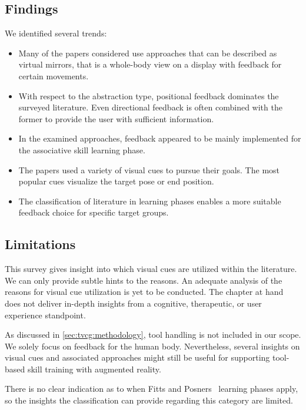 \subsection{Findings}
We identified several trends:
\begin{itemize}
    \vspace{-0.3cm}\item Many of the papers considered use approaches that can be described as virtual mirrors, that is a whole-body view on a display with feedback for certain movements.
    \vspace{-0.3cm}\item With respect to the abstraction type, positional feedback dominates the surveyed literature. Even directional feedback is often combined with the former to provide the user with sufficient information.
    \vspace{-0.3cm}\item In the examined approaches, feedback appeared to be mainly implemented for the associative skill learning phase.
    \vspace{-0.3cm}\item The papers used a variety of visual cues to pursue their goals. The most popular cues visualize the target pose or end position.
    \vspace{-0.3cm}\item The classification of literature in learning phases enables a more suitable feedback choice for specific target groups.
\end{itemize}

\subsection{Limitations}
This survey gives insight into which visual cues are utilized within the literature. We can only provide subtle hints to the reasons. An adequate analysis of the reasons for visual cue utilization is yet to be conducted. The chapter at hand does not deliver in-depth insights from a cognitive, therapeutic, or user experience standpoint.

As discussed in \autoref{sec:tvcg:methodology}, tool handling is not included in our scope. We solely focus on feedback for the human body. Nevertheless, several insights on visual cues and associated approaches might still be useful for supporting tool-based skill training with augmented reality.

There is no clear indication as to when Fitts and Posners~\cite{fitts1967HPe} learning phases apply, so the insights the classification can provide regarding this category are limited.

